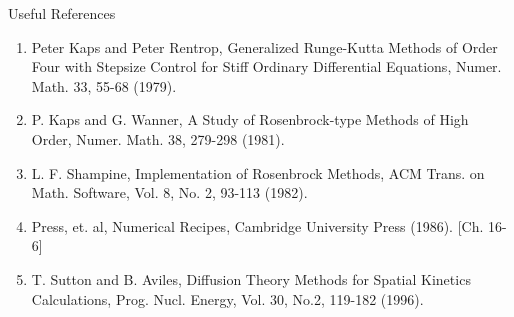 \documentclass[serif]{beamer}
\begin{document}
\begin{frame}{Useful References}
  \begin{enumerate}
    \item Peter Kaps and Peter Rentrop, Generalized Runge-Kutta Methods of Order Four with Stepsize Control for Stiff Ordinary Differential Equations, Numer. Math. 33, 55-68 (1979).
    \item P. Kaps and G. Wanner, A Study of Rosenbrock-type Methods of High Order, Numer. Math. 38, 279-298 (1981).
    \item L. F. Shampine, Implementation of Rosenbrock Methods, ACM Trans. on Math. Software, Vol. 8, No. 2, 93-113 (1982).
    \item Press, et. al, Numerical Recipes, Cambridge University Press (1986). [Ch. 16-6]
    \item T. Sutton and B. Aviles, Diffusion Theory Methods for Spatial Kinetics Calculations, Prog. Nucl. Energy, Vol. 30, No.2, 119-182 (1996).
  \end{enumerate}

\end{frame}


\end{document}
